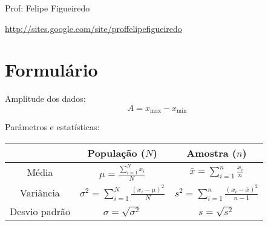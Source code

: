 \documentclass[a4paper]{article}
\begin{document}
\parbox[c]{.825\textwidth}{\raggedright%
{Prof: Felipe Figueiredo\par}
{\url{http://sites.google.com/site/proffelipefigueiredo}}

\vspace{1cm}
}



\section{Formulário}


Amplitude dos dados:
\begin{displaymath}
  A = x_\text{max} - x_\text{min}
\end{displaymath}

Parâmetros e estatísticas:
\begin{center}
  \begin{tabular}[!h]{|c|c|c|}
    \hline
     & População ($N$) & Amostra ($n$) \\
    \hline
    Média & $\mu = \frac{\sum_{i=1}^N x_i}{N}$ & $\bar{x} = \sum_{i=1}^n
    \frac{x_i}{n}$\\
    \hline
    Variância & $\sigma^2 = \sum_{i=1}^N \frac{(x_i - \mu)^2}{N}$& $s^2 = \sum_{i=1}^n \frac{(x_i - \bar{x})^2}{n-1}$
    \\
    \hline
    Desvio padrão & $\sigma = \sqrt{\sigma^2}$& $s = \sqrt{s^2}$\\
    \hline
  \end{tabular}
\end{center}




\end{document}
